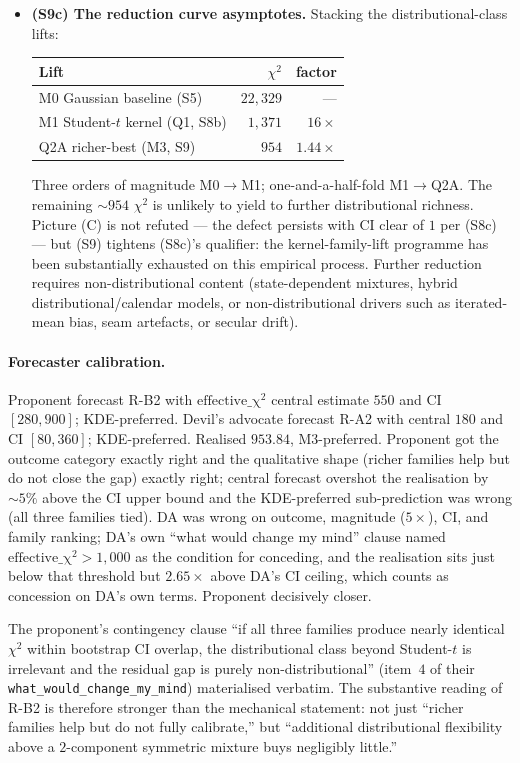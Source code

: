 \documentclass[11pt]{article}
\theoremstyle{definition}
\theoremstyle{plain}
\begin{document}
\begin{itemize}[leftmargin=2em]
\item \textbf{(S9c) The reduction curve asymptotes.} Stacking the
distributional-class lifts:
\begin{center}
\begin{tabular}{lrr}
\toprule
Lift & $\chi^{2}$ & factor \\
\midrule
M0 Gaussian baseline (S5)         & $22{,}329$ & --- \\
M1 Student-$t$ kernel (Q1, S8b)   & $1{,}371$  & $16\times$ \\
Q2A richer-best (M3, S9)          & $954$      & $1.44\times$ \\
\bottomrule
\end{tabular}
\end{center}
Three orders of magnitude M0$\to$M1; one-and-a-half-fold
M1$\to$Q2A. The remaining $\sim 954$ $\chi^{2}$ is unlikely to
yield to further distributional richness. Picture (C) is not
refuted --- the defect persists with CI clear of $1$ per (S8c) ---
but (S9) tightens (S8c)'s qualifier: the kernel-family-lift
programme has been substantially exhausted on this empirical
process. Further reduction requires non-distributional content
(state-dependent mixtures, hybrid distributional/calendar models,
or non-distributional drivers such as iterated-mean bias, seam
artefacts, or secular drift).
\end{itemize}

\paragraph{Forecaster calibration.}
Proponent forecast R-B2 with $\mathrm{effective\_\chi^{2}}$
central estimate $550$ and CI $[280, 900]$; KDE-preferred. Devil's
advocate forecast R-A2 with central $180$ and CI $[80, 360]$;
KDE-preferred. Realised $953.84$, M3-preferred. Proponent got the
outcome category exactly right and the qualitative shape (richer
families help but do not close the gap) exactly right; central
forecast overshot the realisation by $\sim 5\%$ above the CI upper
bound and the KDE-preferred sub-prediction was wrong (all three
families tied). DA was wrong on outcome, magnitude ($5\times$),
CI, and family ranking; DA's own ``what would change my mind''
clause named $\mathrm{effective\_\chi^{2}} > 1{,}000$ as the
condition for conceding, and the realisation sits just below
that threshold but $2.65\times$ above DA's CI ceiling, which counts
as concession on DA's own terms. Proponent decisively closer.

The proponent's contingency clause ``if all three families produce
nearly identical $\chi^{2}$ within bootstrap CI overlap, the
distributional class beyond Student-$t$ is irrelevant and the
residual gap is purely non-distributional'' (item~$4$ of their
\texttt{what\_would\_change\_my\_mind}) materialised verbatim. The
substantive reading of R-B2 is therefore stronger than the
mechanical statement: not just ``richer families help but do not
fully calibrate,'' but ``additional distributional flexibility
above a $2$-component symmetric mixture buys negligibly little.''
\end{document}

